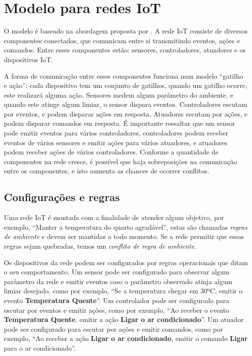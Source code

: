 \section{Modelo para redes IoT} \label{sec:chap3}

O modelo é baseado na abordagem proposta por %
\cite{IoTC2}. A rede IoT consiste de diversos componentes conectados, que comunicam entre si transmitindo eventos, ações e comandos. Entre esses componentes estão: sensores, controladores, atuadores e os dispositivos IoT.

A forma de comunicação entre esses componentes funciona num modelo ``gatilho e ação'': cada dispositivo tem um conjunto de gatilhos, quando um gatilho ocorre, este realizará alguma ação. Sensores medem algum parâmetro do ambiente, e quando este atinge algum limiar, o sensor dispara eventos. Controladores escutam por eventos, e podem disparar ações em resposta. Atuadores escutam por ações, e podem disparar comandos em resposta. É importante ressaltar que um sensor pode emitir eventos para vários controladores, controladores podem receber eventos de vários sensores e emitir ações para vários atuadores, e atuadores podem receber ações de vários controladores. Conforme a quantidade de componentes na rede cresce, é possível que haja sobreposições na comunicação entre os componentes, e isto aumenta as chances de ocorrer conflitos.

\subsection{Configurações e regras} \label{sec:chap3sub1}

Uma rede IoT é montada com a finalidade de atender algum objetivo, por exemplo, ``Manter a temperatura do quarto agradável'', estas são chamadas \textit{regras de ambiente} e devem ser mantidas a todo momento. Se a rede permitir que essas regras sejam quebradas, temos um \textit{conflito de regra de ambiente}.

Os dispositivos da rede podem ser configurados por regras operacionais que ditam o seu comportamento. Um sensor pode ser configurado para observar algum parâmetro da rede e emitir eventos caso o parâmetro observado atinja algum limiar desejado, como por exemplo, ``Se a temperatura chegar em 30ºC, emitir o evento \textbf{Temperatura Quente}''. Um controlador pode ser configurado para escutar por eventos e emitir ações, como por exemplo, ``Ao receber o evento \textbf{Temperatura Quente}, emitir a ação \textbf{Ligar o ar condicionado}''. Um atuador pode ser configurado para escutar por ações e emitir comandos, como por exemplo, ``Ao receber a ação \textbf{Ligar o ar condicionado}, emitir o comando \textbf{Ligar} para o ar condicionado''.

